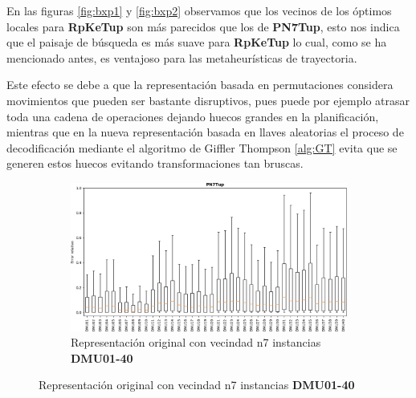 En las figuras \ref{fig:bxp1} y \ref{fig:bxp2} observamos que los vecinos de los óptimos locales para \textbf{RpKeTup} son más parecidos que los de \textbf{PN7Tup}, esto nos indica que el paisaje de búsqueda es más suave para \textbf{RpKeTup} lo cual, como se ha mencionado antes, es ventajoso para las metaheurísticas de trayectoria.  

Este efecto se debe a que la representación basada en permutaciones considera movimientos que pueden ser bastante disruptivos, pues puede por ejemplo 
atrasar toda una cadena de operaciones dejando huecos grandes en la planificación, mientras que en la nueva representación basada en llaves aleatorias el proceso de decodificación mediante el algoritmo de Giffler Thompson \ref{alg:GT} evita que se generen estos huecos evitando transformaciones tan bruscas.
\begin{figure}[hbtp]
    \begin{subfigure}{\textwidth}
        \centering
        \includegraphics[scale=.6]{Imagenes/bxpn7_1.png}
        \caption{Representación original con vecindad n7 instancias \textbf{DMU01-40}}
    \end{subfigure}
\end{figure}
